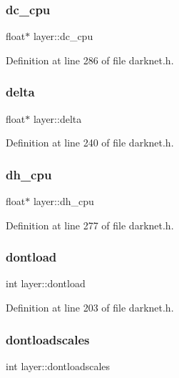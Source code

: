 \subsubsection{\texorpdfstring{dc\_cpu}{dc\_cpu}}
{\footnotesize\ttfamily float$\ast$ layer\+::dc\+\_\+cpu}



Definition at line 286 of file darknet.\+h.

\mbox{\label{structlayer_a1360cf3c28df067cc6f3af139fa95d3a}} 
\subsubsection{\texorpdfstring{delta}{delta}}
{\footnotesize\ttfamily float$\ast$ layer\+::delta}



Definition at line 240 of file darknet.\+h.

\mbox{\label{structlayer_acb9dec30688fb0f1d836e14e507a441d}} 
\subsubsection{\texorpdfstring{dh\_cpu}{dh\_cpu}}
{\footnotesize\ttfamily float$\ast$ layer\+::dh\+\_\+cpu}



Definition at line 277 of file darknet.\+h.

\mbox{\label{structlayer_a90d11f2ddc0ae1f0bfcce33d5eab9f1b}} 
\subsubsection{\texorpdfstring{dontload}{dontload}}
{\footnotesize\ttfamily int layer\+::dontload}



Definition at line 203 of file darknet.\+h.

\mbox{\label{structlayer_a5ba6e7bfc48b309721ddbed942d2d531}} 
\subsubsection{\texorpdfstring{dontloadscales}{dontloadscales}}
{\footnotesize\ttfamily int layer\+::dontloadscales}



